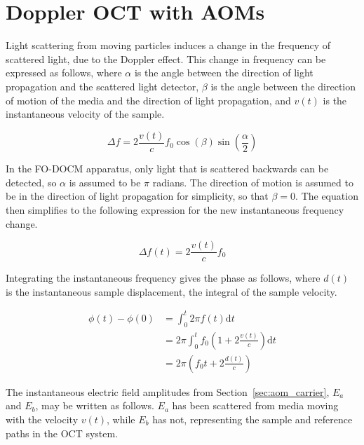 \section{Doppler OCT with AOMs}
\label{sec:doppler_aom}


Light scattering from moving particles induces a change in the frequency of scattered light, due to the Doppler effect. This change in frequency can be expressed as follows, where $\alpha$ is the angle between the direction of light propagation and the scattered light detector, $\beta$ is the angle between the direction of motion of the media and the direction of light propagation, and $v(t)$ is the instantaneous velocity of the sample. \cite{hurst}


\begin{equation} \Delta f = 2 \frac{v(t)}{c} f_0 \cos{(\beta)} \sin{(\frac{\alpha}{2})} \end{equation}

In the FO-DOCM apparatus, only light that is scattered backwards can be detected, so $\alpha$ is assumed to be $\pi$ radians. The direction of motion is assumed to be in the direction of light propagation for simplicity, so that $\beta = 0$. The equation then simplifies to the following expression for the new instantaneous frequency change.

\begin{equation} \Delta f(t) = 2 \frac{v(t)}{c} f_0 \end{equation}

Integrating the instantaneous frequency gives the phase as follows, where $d(t)$ is the instantaneous sample displacement, the integral of the sample velocity.

\begin{align}
\phi(t) - \phi(0) & = \int_0^{t} 2 \pi f(t) \mathrm{d}t \\
& = 2 \pi \int_0^t f_0 (1 + 2 \frac{v(t)}{c}) \mathrm{d}t \\
& = 2 \pi \left( f_0 t + 2 \frac{d(t)}{c} \right)
\end{align}

The instantaneous electric field amplitudes from Section~\ref{sec:aom_carrier}, $E_a$ and $E_b$, may be written as follows. $E_a$ has been scattered from media moving with the velocity $v(t)$, while $E_b$ has not, representing the sample and reference paths in the OCT system.


